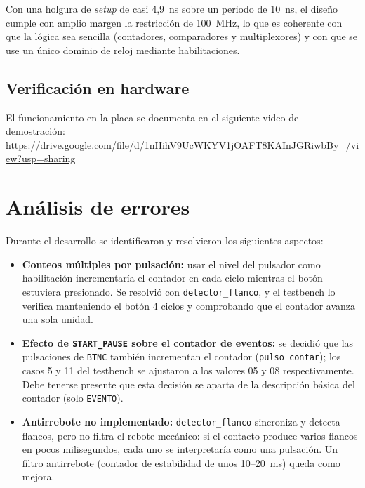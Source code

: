 \documentclass[letterpaper,12pt]{article}
\begin{document}
Con una holgura de \emph{setup} de casi 4,9~ns sobre un periodo de 10~ns, el diseño cumple con amplio margen la restricción de 100~MHz, lo que es coherente con que la lógica sea sencilla (contadores, comparadores y multiplexores) y con que se use un único dominio de reloj mediante habilitaciones.

\subsection{Verificación en hardware}
El funcionamiento en la placa se documenta en el siguiente video de demostración: \url{https://drive.google.com/file/d/1nHihV9UcWKYV1jOAFT8KAInJGRiwbBy_/view?usp=sharing}

\section{Análisis de errores}
Durante el desarrollo se identificaron y resolvieron los siguientes aspectos:
\begin{itemize}
    \item \textbf{Conteos múltiples por pulsación:} usar el nivel del pulsador como habilitación incrementaría el contador en cada ciclo mientras el botón estuviera presionado. Se resolvió con \texttt{detector\_flanco}, y el testbench lo verifica manteniendo el botón 4 ciclos y comprobando que el contador avanza una sola unidad.
    \item \textbf{Efecto de \texttt{START\_PAUSE} sobre el contador de eventos:} se decidió que las pulsaciones de \texttt{BTNC} también incrementan el contador (\texttt{pulso\_contar}); los casos 5 y 11 del testbench se ajustaron a los valores 05 y 08 respectivamente. Debe tenerse presente que esta decisión se aparta de la descripción básica del contador (solo \texttt{EVENTO}).
    \item \textbf{Antirrebote no implementado:} \texttt{detector\_flanco} sincroniza y detecta flancos, pero no filtra el rebote mecánico: si el contacto produce varios flancos en pocos milisegundos, cada uno se interpretaría como una pulsación. Un filtro antirrebote (contador de estabilidad de unos 10--20~ms) queda como mejora.
\end{itemize}

\end{document}
